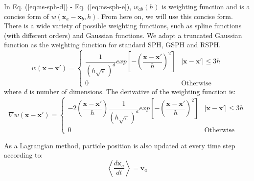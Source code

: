 \documentclass[review]{elsarticle}
\begin{document}
In Eq. (\ref{eq:ns-sph-d}) - Eq. (\ref{eq:ns-sph-e}), $w_{a b}\left(h\right)$ is weighting function and is a concise form of $w\left(\textbf{x}_a - \textbf{x}_b, h\right)$. From here on, we will use this concise form.
There is a wide variety of possible weighting functions, such as spline functions (with different orders) and Gaussian functions. We adopt a truncated Gaussian function as the weighting function for standard SPH, GSPH and RSPH.
\begin{equation}
w\left(\textbf{x} - \textbf{x} \prime \right) = 
\begin{cases} 
      \dfrac{1}{\left(h \sqrt{\pi}\right)^d} exp \left[- \left(\dfrac{\textbf{x} - \textbf{x} \prime}{h} \right)^2 \right] &  \vert \textbf{x} - \textbf{x} \prime \vert \leq 3h\\
      0 & \text{Otherwise}
\end{cases}
\label{eq:SPH-kernel}
\end{equation}
where $d$ is number of dimensions.
The derivative of the weighting function is:
\begin{equation}
\nabla w\left(\textbf{x} - \textbf{x} \prime \right) = 
\begin{cases} 
      -2\left(\dfrac{\textbf{x} - \textbf{x} \prime}{h}\right) \dfrac{1}{\left(h \sqrt{\pi}\right)^d} exp \left[- \left(\dfrac{\textbf{x} - \textbf{x} \prime}{h}\right)^2 \right] &  \vert \textbf{x} - \textbf{x} \prime \vert \leq 3h\\
      0 & \text{Otherwise}
\end{cases}
\label{eq:SPH-kernel-gradient}
\end{equation}

As a Lagrangian method, particle position is also updated at every time step according to:
\begin{equation}
\left\langle\dfrac{d \textbf{x}_a}{dt}\right\rangle = \textbf{v}_a \label{eq:SPH-update-pos}
\end{equation}
\end{document}
